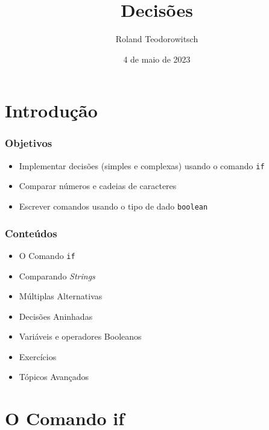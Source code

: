 \documentclass[xcolor={dvipsnames,table},aspectratio=169]{beamer}
\title[\sc{Decisões}]{Decisões}
\author[Roland Teodorowitsch]{Roland Teodorowitsch}
\institute[FPROG - EP - PUCRS]{Fundamentos de Programação - Escola Politécnica - PUCRS}
\date{4 de maio de 2023}
\begin{document}
\justifying

\begin{frame}
	\titlepage
\end{frame}

\section{Introdução}

\begin{frame}\frametitle{Objetivos}
\begin{itemize}
	\item Implementar decisões (simples e complexas) usando o comando \texttt{if}
	\item Comparar números e cadeias de caracteres
	\item Escrever comandos usando o tipo de dado \texttt{boolean}
\end{itemize}
\end{frame}

\begin{frame}\frametitle{Conteúdos}
\begin{itemize}
	\item O Comando \texttt{if}
	\item Comparando \emph{Strings}
	\item Múltiplas Alternativas
	\item Decisões Aninhadas
	\item Variáveis e operadores Booleanos
	\item Exercícios
	\item Tópicos Avançados
\end{itemize}
\end{frame}

\section{O Comando if}
\end{document}
